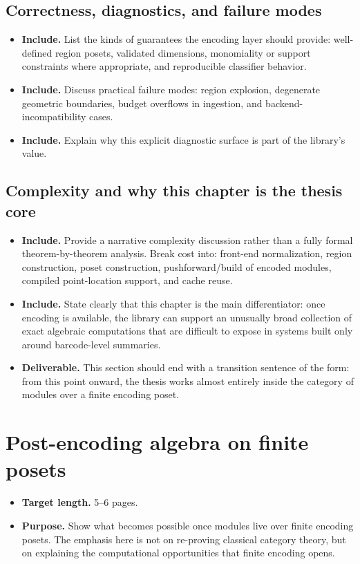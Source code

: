 \documentclass[11pt]{article}
\newenvironment{plan}{\begin{itemize}[leftmargin=1.6em,itemsep=0.35em,topsep=0.25em]}{\end{itemize}}
\newcommand{\target}[1]{\item \textbf{Target length.} #1}
\newcommand{\purpose}[1]{\item \textbf{Purpose.} #1}
\newcommand{\includeitems}[1]{\item \textbf{Include.} #1}
\newcommand{\deliverable}[1]{\item \textbf{Deliverable.} #1}
\begin{document}
\subsection{Correctness, diagnostics, and failure modes}

\begin{plan}
    \includeitems{List the kinds of guarantees the encoding layer should provide: well-defined region posets, validated dimensions, monomiality or support constraints where appropriate, and reproducible classifier behavior.}
    \includeitems{Discuss practical failure modes: region explosion, degenerate geometric boundaries, budget overflows in ingestion, and backend-incompatibility cases.}
    \includeitems{Explain why this explicit diagnostic surface is part of the library's value.}
\end{plan}

\subsection{Complexity and why this chapter is the thesis core}

\begin{plan}
    \includeitems{Provide a narrative complexity discussion rather than a fully formal theorem-by-theorem analysis. Break cost into: front-end normalization, region construction, poset construction, pushforward/build of encoded modules, compiled point-location support, and cache reuse.}
    \includeitems{State clearly that this chapter is the main differentiator: once encoding is available, the library can support an unusually broad collection of exact algebraic computations that are difficult to expose in systems built only around barcode-level summaries.}
    \deliverable{This section should end with a transition sentence of the form: from this point onward, the thesis works almost entirely inside the category of modules over a finite encoding poset.}
\end{plan}

\section{Post-encoding algebra on finite posets}\label{sec:post-encoding-algebra}

\begin{plan}
    \target{5--6 pages.}
    \purpose{Show what becomes possible once modules live over finite encoding posets. The emphasis here is not on re-proving classical category theory, but on explaining the computational opportunities that finite encoding opens.}
\end{plan}
\end{document}
